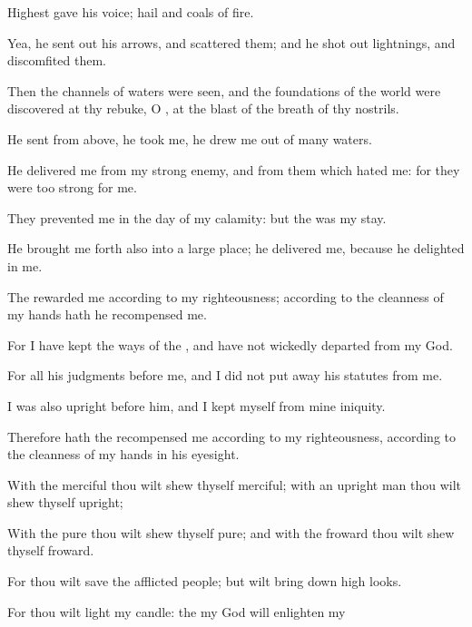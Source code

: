 {Highest
gave his
voice;
hail
{} and
coals of
fire.
\par }{\Q {}Yea, he sent
out his
arrows, and
scattered them; and he shot
out
lightnings, and
discomfited them.
\par }{\Q {}Then the
channels of
waters were
seen, and the
foundations of the
world were
discovered at thy
rebuke, O
{}, at the
blast of the
breath of thy
nostrils.
\par }{\Q {}He
sent from
above, he
took me, he
drew me out of
many
waters.
\par }{\Q {}He
delivered me from my
strong
enemy, and from them which
hated me: for they were too
strong for me.
\par }{\Q {}They
prevented me in the
day of my
calamity: but the
{} was my
stay.
\par }{\Q {}He brought me
forth also into a large
place; he
delivered me, because he
delighted in me.
\par }{\BB \par }{\Q {}The
{}
rewarded me according to my
righteousness; according to the
cleanness of my
hands hath he
recompensed me.
\par }{\Q {}For I have
kept the
ways of the
{}, and have not wickedly
departed from my
God.
\par }{\Q {}For all his
judgments
{} before me, and I did not put
away his
statutes from me.
\par }{\Q {}I was also
upright before him, and I
kept myself from mine
iniquity.
\par }{\Q {}Therefore hath the
{}
recompensed me according to my
righteousness, according to the
cleanness of my
hands in his
eyesight.
\par }{\Q {}With the
merciful thou wilt shew thyself
merciful; with an
upright
man thou wilt shew thyself
upright;
\par }{\Q {}With the
pure thou wilt shew thyself
pure; and with the
froward thou wilt shew thyself
froward.
\par }{\Q {}For thou wilt
save the
afflicted
people; but wilt bring
down
high
looks.
\par }{\Q {}For thou wilt
light my
candle: the
{} my
God will
enlighten my
}
